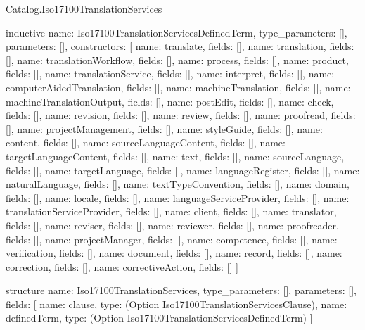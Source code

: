 \begin{lexlean}{Catalog.Iso17100TranslationServices}
\begin{semanticmodule}
inductive{
  name: Iso17100TranslationServicesDefinedTerm,
  type_parameters: [],
  parameters: [],
  constructors: [
    {name: translate, fields: []},
    {name: translation, fields: []},
    {name: translationWorkflow, fields: []},
    {name: process, fields: []},
    {name: product, fields: []},
    {name: translationService, fields: []},
    {name: interpret, fields: []},
    {name: computerAidedTranslation, fields: []},
    {name: machineTranslation, fields: []},
    {name: machineTranslationOutput, fields: []},
    {name: postEdit, fields: []},
    {name: check, fields: []},
    {name: revision, fields: []},
    {name: review, fields: []},
    {name: proofread, fields: []},
    {name: projectManagement, fields: []},
    {name: styleGuide, fields: []},
    {name: content, fields: []},
    {name: sourceLanguageContent, fields: []},
    {name: targetLanguageContent, fields: []},
    {name: text, fields: []},
    {name: sourceLanguage, fields: []},
    {name: targetLanguage, fields: []},
    {name: languageRegister, fields: []},
    {name: naturalLanguage, fields: []},
    {name: textTypeConvention, fields: []},
    {name: domain, fields: []},
    {name: locale, fields: []},
    {name: languageServiceProvider, fields: []},
    {name: translationServiceProvider, fields: []},
    {name: client, fields: []},
    {name: translator, fields: []},
    {name: reviser, fields: []},
    {name: reviewer, fields: []},
    {name: proofreader, fields: []},
    {name: projectManager, fields: []},
    {name: competence, fields: []},
    {name: verification, fields: []},
    {name: document, fields: []},
    {name: record, fields: []},
    {name: correction, fields: []},
    {name: correctiveAction, fields: []}
  ]
}

structure{
  name: Iso17100TranslationServices,
  type_parameters: [],
  parameters: [],
  fields: [
    {name: clause, type: (Option Iso17100TranslationServicesClause)},
    {name: definedTerm, type: (Option Iso17100TranslationServicesDefinedTerm)}
  ]
}
\end{semanticmodule}
\end{lexlean}
